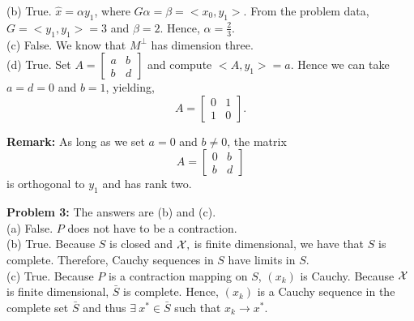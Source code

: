 \documentclass[letterpaper]{article}
\begin{document}
(b) True. $\hat{x}=\alpha y_1$, where $G \alpha = \beta=<x_0,y_1>.$ From the problem data, $G=<y_1,y_1> =3$ and $\beta=2$. Hence, $\alpha = \frac{2}{3}$.\\

%
%

(c) False.   We know that $M^\perp$ has dimension three. \\

(d) True. Set $A=\left[ \begin{array}{rr} a & b \\ b & d \end{array} \right]$ and compute $<A,y_1>=a$. Hence we can take $a=d=0$ and $b=1$, yielding,
$$A=\left[ \begin{array}{rr} 0 & 1 \\ 1 & 0 \end{array} \right].$$

\textbf{Remark:} As long as we set $a=0$ and $b\neq 0$, the matrix $$A=\left[ \begin{array}{rr} 0 & b \\ b & d \end{array} \right]$$
is orthogonal to $y_1$ and has rank two.


\newpage



\noindent \textbf{Problem 3:} The answers are (b) and (c). \\

(a) False. $P$ does not have to be a contraction.\\



(b) True. Because $S$ is closed and ${\cal X},$ is finite dimensional, we have that $S$ is complete.  Therefore, Cauchy sequences in $S$ have limits in $S$. \\



(c) True.  Because $P$ is a contraction mapping on $S$, $(x_k)$ is Cauchy. Because ${\cal X}$ is finite dimensional, $\bar{S}$ is complete. Hence, $(x_k)$ is a Cauchy sequence in the complete set $\bar{S}$ and thus $\exists~x^* \in \bar{S}$ such that $ x_k \to x^*$.\\
\end{document}
